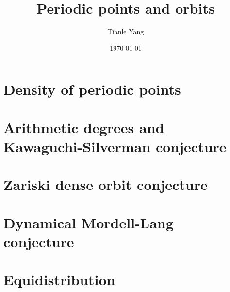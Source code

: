 \documentclass[sectionlevel=chapter,status=draft]{noteformyself}
\title{Periodic points and orbits}
\author{Tianle Yang}
\date{\today}
\begin{document}
    \maketitle

    \tableofcontents

    \section[
      status=draft,
      tag=00000,
      label=\labelNFM{sec:periodic-points-and-orbits:density-of-periodic-points-for-cohomologically-hyperbolic-maps}
    ]{Density of periodic points}
    
    \section[
      status=draft,
      tag=00000,
      label=\labelNFM{sec:periodic-points-and-orbits:arithmetic-degrees-and-kawaguchi-silverman-conjecture}
    ]{Arithmetic degrees and Kawaguchi-Silverman conjecture}
    
    \section[
      status=draft,
      tag=00000,
      label=\labelNFM{sec:periodic-points-and-orbits:zariski-dense-orbit-conjecture}
    ]{Zariski dense orbit conjecture}
    
    \section[
      status=draft,
      tag=00000,
      label=\labelNFM{sec:periodic-points-and-orbits:dynamical-mordell-lang-conjecture}
    ]{Dynamical Mordell-Lang conjecture}
    
    \section[
      status=draft,
      tag=00000,
      label=\labelNFM{sec:periodic-points-and-orbits:equidistribution}
    ]{Equidistribution}
    

    \printbibliography[heading=bibintoc, title={References}]
\end{document}
